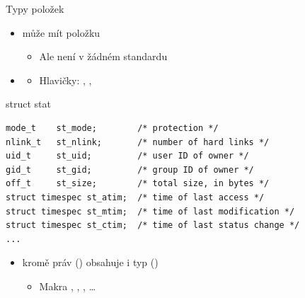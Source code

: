 \begin{frame}[fragile]{Typy položek}

  \begin{itemize}
    \item {} může mít položku 
    \begin{itemize}
      \item Ale není v žádném standardu
    \end{itemize}

    \pause

    \item {}
    \begin{itemize}
      \item Hlavičky: , ,
    \end{itemize}
  \end{itemize}

  \begin{block}{struct stat}
  \begin{lstlisting}
mode_t    st_mode;        /* protection */
nlink_t   st_nlink;       /* number of hard links */
uid_t     st_uid;         /* user ID of owner */
gid_t     st_gid;         /* group ID of owner */
off_t     st_size;        /* total size, in bytes */
struct timespec st_atim;  /* time of last access */
struct timespec st_mtim;  /* time of last modification */
struct timespec st_ctim;  /* time of last status change */
...
  \end{lstlisting}
  \end{block}

  \begin{itemize}
    \item {} kromě práv () obsahuje i typ
      ()
    \begin{itemize}
      \item Makra , , , \dots
    \end{itemize}
  \end{itemize}

\end{frame}

